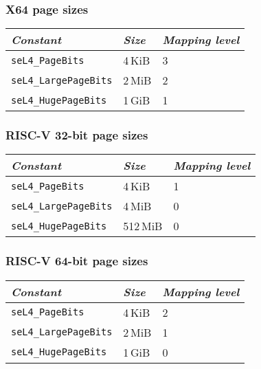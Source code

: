 \subsubsection{X64 page sizes}

\begin{tabularx}{\textwidth}{Xll} \toprule
    \emph{Constant}             & \emph{Size} & \emph{Mapping level} \\ \midrule
    \texttt{seL4\_PageBits}      & 4\,KiB      & 3                   \\
    \texttt{seL4\_LargePageBits} & 2\,MiB      & 2                   \\
    \texttt{seL4\_HugePageBits}  & 1\,GiB      & 1                   \\
    \bottomrule
\end{tabularx}

\subsubsection{RISC-V 32-bit page sizes}

\begin{tabularx}{\textwidth}{Xll} \toprule
    \emph{Constant}             & \emph{Size} & \emph{Mapping level} \\ \midrule
    \texttt{seL4\_PageBits}      & 4\,KiB      & 1                   \\
    \texttt{seL4\_LargePageBits} & 4\,MiB      & 0                   \\
    \texttt{seL4\_HugePageBits}  & 512\,MiB    & 0                   \\
    \bottomrule
\end{tabularx}

\subsubsection{RISC-V 64-bit page sizes}

\begin{tabularx}{\textwidth}{Xll} \toprule
    \emph{Constant}             & \emph{Size} & \emph{Mapping level} \\ \midrule
    \texttt{seL4\_PageBits}      & 4\,KiB      & 2                   \\
    \texttt{seL4\_LargePageBits} & 2\,MiB      & 1                   \\
    \texttt{seL4\_HugePageBits}  & 1\,GiB      & 0                   \\
    \bottomrule
\end{tabularx}

